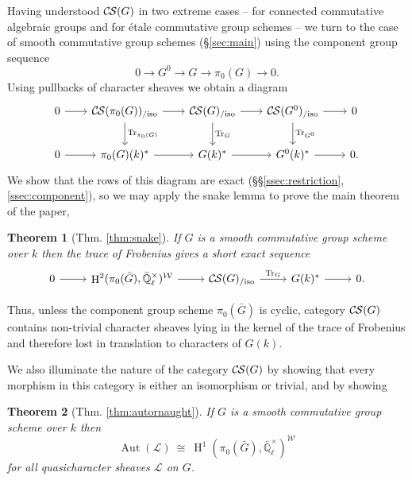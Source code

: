 \documentclass[10pt]{amsart}
\theoremstyle{plain}
\newtheorem*{theorem*}{Theorem}
\theoremstyle{definition}
\newcommand{\EE}{\mathbb{\bar Q}_\ell}
\newcommand{\bFq}{\bar{k}}
\newcommand{\Fq}{k}
\newcommand{\EEx}{\EE^\times}
\newcommand{\Weil}[1]{\mathcal{W}_{#1}}
\DeclareMathOperator{\Gal}{Gal}
\DeclareMathOperator{\Aut}{Aut}
\DeclareMathOperator{\Hom}{Hom}
\DeclareMathOperator{\Hh}{H}
\newcommand{\iso}{{\ \cong\ }}
\newcommand{\TrFrob}[1]{\operatorname{Tr}_{#1}}
\newcommand{\cs}[1]{{\mathcal{#1}}}
\newcommand{\CS}{{\mathcal{C\hskip-0.8pt S}}}
\newcommand{\CSiso}[1]{\CS(#1)_{/\text{iso}}}
\newcommand{\bG}{\bar{G}}
\begin{document}

Having understood $\CS(G)$ in two extreme cases --
for connected commutative algebraic groups and for \'etale commutative group schemes --
we turn to the case of smooth commutative group schemes (\S\ref{sec:main}) using the component group sequence
\[
0 \to G^0 \to G \to \pi_0(G) \to 0.
\]
Using pullbacks of character sheaves we obtain a diagram
\[
  \begin{tikzcd}[row sep=20, column sep=20]
    0 \rar & \CSiso{\pi_0(G)} \rar \dar{\TrFrob{\pi_0(G)}}
    & \CSiso{G} \rar \dar{\TrFrob{G}} & \CSiso{G^0} \rar \dar{\TrFrob{G^0}} & 0\\
    0 \rar & \pi_0(G)(\Fq)^* \rar & G(\Fq)^* \rar & G^0(\Fq)^* \rar & 0.
  \end{tikzcd}
\]
We show that the rows of this diagram are exact (\S\S\ref{ssec:restriction},\ref{ssec:component}),
so we may apply the snake lemma to prove the main theorem of the paper,
\begin{theorem*}[{Thm. \ref{thm:snake}}]
If $G$ is a smooth commutative group scheme over $\Fq$ then the trace of Frobenius gives a short exact sequence
\[
\begin{tikzcd}
0 \arrow{r} & \Hh^2(\pi_0(\bG),\EEx)^{\Weil{}} \arrow{r} & \CSiso{G} \arrow{r}{\TrFrob{G}} & G(\Fq)^* \arrow{r} & 0.
\end{tikzcd}
\]
\end{theorem*}
\noindent
Thus, unless the component group scheme $\pi_0(\bG)$ is cyclic, category $\CS(G)$ contains
non-trivial character sheaves lying in the kernel of the trace of Frobenius and therefore lost in translation to characters of $G(\Fq)$.


We also illuminate the nature of the category $\CS(G)$ by showing that every morphism in this category
is either an isomorphism or trivial, and by showing
\begin{theorem*}[{Thm. \ref{thm:autornaught}}]
If $G$ is a smooth commutative group scheme over $\Fq$ then
\[
\Aut(\cs{L}) \iso  \Hh^1(\pi_0(\bG), \EEx)^{\Weil{}}
\]
for all quasicharacter sheaves $\cs{L}$ on $G$.
\end{theorem*}
\end{document}
